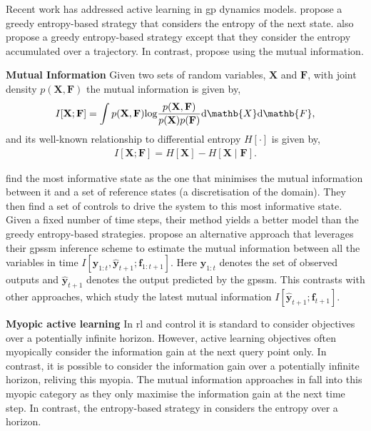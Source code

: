\documentclass{mimosis-class/mimosis}
\numberwithin{equation}{chapter}
\begin{document}
Recent work has addressed active learning in \acrshort{gp} dynamics models. \cite{schreiterSafe2015}
propose a greedy entropy-based strategy that considers the entropy of the
next state. \cite{buisson-fenetActively2020} also propose a greedy entropy-based strategy
except that they consider the entropy accumulated over a trajectory. In contrast,
\cite{caponeLocalized2020,yuActive2021} propose using the mutual information.
\begin{myquote}
\textbf{Mutual Information}
Given two sets of random variables, $\mathbf{X}$ and $\mathbf{F}$, with joint density $p(\mathbf{X}, \mathbf{F})$ the
mutual information \citep{coverElements2006} is given by,
\begin{align} \label{eq-mutual-information}
I[\mathbf{X};\mathbf{F}] = \int p(\mathbf{X},\mathbf{F}) \text{log}\frac{p(\mathbf{X},\mathbf{F})}{p(\mathbf{X})p(\mathbf{F})}
\text{d}\mathb{X} \text{d}\mathb{F},
\end{align}
and its well-known relationship to differential entropy $H[\cdot]$ is given by,
\begin{align} \label{eq-mutual-information-entropy}
I[\mathbf{X};\mathbf{F}] =  H[\mathbf{X}] - H[\mathbf{X} \mid \mathbf{F}].
\end{align}
\end{myquote}
\cite{caponeLocalized2020} find the most informative state as the one that minimises the
mutual information between it and a set of reference states (a discretisation of the
domain). They then find a set of controls to drive the system to this most informative state.
Given a fixed number of time steps, their method yields a better model
than the greedy entropy-based strategies.
\cite{yuActive2021}  propose an alternative
approach that leverages their \acrfull{gpssm} inference scheme to estimate the mutual
information between all the variables in time
\(I \left[\mathbf{y}_{1:t}, \hat{\mathbf{y}}_{t+1} ; \mathbf{f}_{1:t+1} \right]\).
Here \(\mathbf{y}_{1:t}\) denotes the set of observed outputs and \(\hat{\mathbf{y}}_{t+1}\) denotes
the output predicted by the \acrshort{gpssm}. This contrasts with other approaches, which
study the latest mutual information \(I[\hat{\mathbf{y}}_{t+1} ; \mathbf{f}_{t+1}]\).

\textbf{Myopic active learning}
In \acrshort{rl} and control it is standard to consider objectives over a potentially infinite horizon.
However, active learning objectives often myopically consider the information gain at the next query point only.
In contrast, it is possible to consider the information gain over a potentially infinite horizon, reliving this myopia.
The mutual information approaches in \cite{caponeLocalized2020,yuActive2021}
fall into this myopic category as they only maximise the information gain at the next
time step. In contrast, the entropy-based strategy in
\cite{buisson-fenetActively2020} considers the entropy over a horizon.
\end{document}
